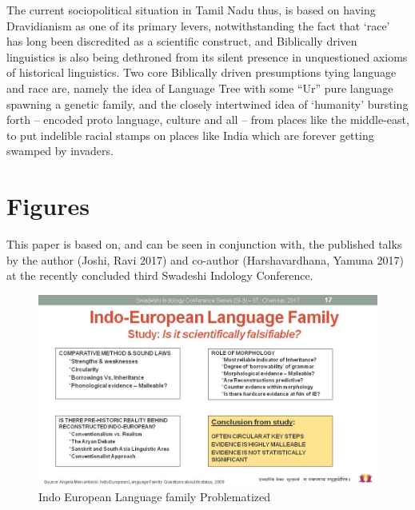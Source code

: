 The current sociopolitical situation in Tamil Nadu thus, is based on having Dravidianism as one of its primary levers, notwithstanding the fact that ‘race’ has long been discredited as a scientific construct, and Biblically driven linguistics is also being dethroned from its silent presence in unquestioned axioms of historical linguistics. Two core Biblically driven presumptions tying language and race are, namely the idea of Language Tree with some “Ur” pure language spawning a genetic family, and the closely intertwined idea of ‘humanity’ bursting forth – encoded proto language, culture and all – from places like the middle-east, to put indelible racial stamps on places like India which are forever getting swamped by invaders.


\section*{Figures}

\vskip -7pt

This paper is based on, and can be seen in conjunction with, the published talks by the author (Joshi, Ravi 2017) and co-author (Harshavardhana, Yamuna 2017) at the recently concluded third Swadeshi Indology Conference.

\vskip 4pt

\begin{figure}[!hbp]
\includegraphics[scale=0.29]{"images/article-02/art02-fig01.jpg"}
\caption{Indo European Language family Problematized}\label{art2-fig01}
\end{figure}

\newpage

